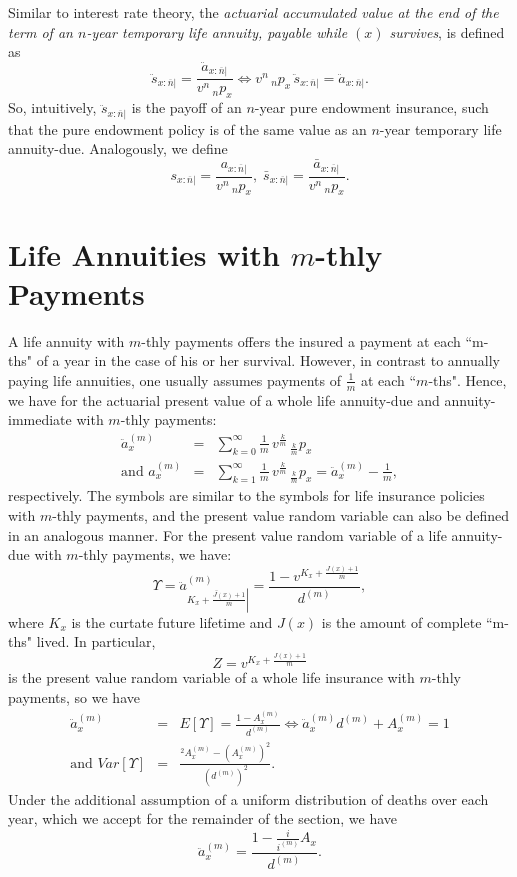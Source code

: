 \documentclass[11pt,fleqn,oneside]{book}
\begin{document}
Similar to interest rate theory, the \textit{actuarial accumulated value at the end of the term of an $n$-year temporary life annuity, payable while $(x)$ survives}, is defined as
$$
\ddot{s}_{x:\overline{n}|} = \frac{\ddot{a}_{x:\overline{n}|}}{v^n\,{_np_x}} \Leftrightarrow v^n\,{_np_x} \,\ddot{s}_{x:\overline{n}|} = \ddot{a}_{x:\overline{n}|}.
$$
So, intuitively, $\ddot{s}_{x:\overline{n}|}$ is the payoff of an $n$-year pure endowment insurance, such that the pure endowment policy is of the same value as an $n$-year temporary life annuity-due. Analogously, we define
$$
{s}_{x:\overline{n}|} = \frac{a_{x:\overline{n}|}}{v^n\,{_np_x}},\; \bar{s}_{x:\overline{n}|} = \frac{\bar{a}_{x:\overline{n}|}}{v^n\,{_np_x}}.
$$



\section{Life Annuities with $m$-thly Payments}
\label{SECMONANN}

A life annuity with $m$-thly payments offers the insured a payment at each ``m-ths" of a year in the case of his or her survival. However, in contrast to annually paying life annuities, one usually assumes payments of $\frac{1}{m}$ at each ``$m$-ths". Hence, we have for the actuarial present value of a whole life annuity-due and annuity-immediate with $m$-thly payments:
\begin{eqnarray*}
\ddot{a}_x^{(m)} &=& \sum_{k=0}^{\infty} \frac{1}{m} \,v^{\frac{k}{m}}\, {_{\frac{k}{m}}p_x} \\
\text{and }a_x^{(m)} &=& \sum_{k=1}^{\infty} \frac{1}{m} \,v^{\frac{k}{m}}\, {_{\frac{k}{m}}p_x} 
= \ddot{a}_x^{(m)} - \frac{1}{m},
\end{eqnarray*}
respectively. The symbols are similar to the symbols for life insurance policies with $m$-thly payments, and the present value random variable can also be defined in an analogous manner. For the present value random variable of a life annuity-due with $m$-thly payments, we have:
$$
\Upsilon = \ddot{a}^{(m)}_{\left.\overline{K_x + \frac{J(x)+1}{m}}\right|} = \frac{1 - v^{K_x + \frac{J(x)+1}{m}}}{d^{(m)}},
$$
where $K_x$ is the curtate future lifetime and $J(x)$ is the amount of complete ``m-ths" lived. In particular, 
$$
Z = v^{K_x + \frac{J(x)+1}{m}}
$$
is the present value random variable of a whole life insurance with $m$-thly payments, so we have
\begin{eqnarray*}
\ddot{a}_x^{(m)}  &=& E[\Upsilon] = \frac{1 - A_x^{(m)}}{d^{(m)}} \Leftrightarrow \ddot{a}_x^{(m)} d^{(m)} + A_x^{(m)} = 1\\
\text{and } Var[\Upsilon] &=& \frac{{^2A_x^{(m)}} - \left(A_x^{(m)}\right)^2}{\left(d^{(m)}\right)^2}.
\end{eqnarray*}
Under the additional assumption of a uniform distribution of deaths over each year, which we accept for the remainder of the section, we have
$$
\ddot{a}_x^{(m)}  = \frac{1 - \frac{i}{i^{(m)}}A_x}{d^{(m)}}.
$$
\end{document}

